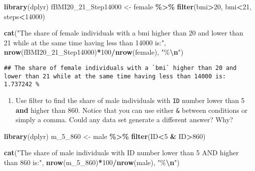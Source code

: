 \documentclass[
]{book}
\newenvironment{Shaded}{\begin{snugshade}}{\end{snugshade}}
\newcommand{\DecValTok}[1]{\textcolor[rgb]{0.00,0.00,0.81}{#1}}
\newcommand{\FunctionTok}[1]{\textcolor[rgb]{0.13,0.29,0.53}{\textbf{#1}}}
\newcommand{\NormalTok}[1]{#1}
\newcommand{\OtherTok}[1]{\textcolor[rgb]{0.56,0.35,0.01}{#1}}
\newcommand{\SpecialCharTok}[1]{\textcolor[rgb]{0.81,0.36,0.00}{\textbf{#1}}}
\newcommand{\StringTok}[1]{\textcolor[rgb]{0.31,0.60,0.02}{#1}}
\providecommand{\tightlist}{%
  \setlength{\itemsep}{0pt}\setlength{\parskip}{0pt}}
\begin{document}
\begin{Shaded}
\begin{Highlighting}[]
\FunctionTok{library}\NormalTok{(dplyr)}
\NormalTok{fBMI20\_21\_Step14000 }\OtherTok{\textless{}{-}}\NormalTok{ female }\SpecialCharTok{\%\textgreater{}\%}
  \FunctionTok{filter}\NormalTok{(bmi}\SpecialCharTok{\textgreater{}}\DecValTok{20}\NormalTok{, bmi}\SpecialCharTok{\textless{}}\DecValTok{21}\NormalTok{, steps}\SpecialCharTok{\textless{}}\DecValTok{14000}\NormalTok{)}

\FunctionTok{cat}\NormalTok{(}\StringTok{"The share of female individuals with a \textasciigrave{}bmi\textasciigrave{} higher than 20 and lower than 21 while at the same time having less than 14000 is:"}\NormalTok{, }\FunctionTok{nrow}\NormalTok{(fBMI20\_21\_Step14000)}\SpecialCharTok{*}\DecValTok{100}\SpecialCharTok{/}\FunctionTok{nrow}\NormalTok{(female), }\StringTok{"\%}\SpecialCharTok{\textbackslash{}n}\StringTok{"}\NormalTok{)}
\end{Highlighting}
\end{Shaded}

\begin{verbatim}
## The share of female individuals with a `bmi` higher than 20 and lower than 21 while at the same time having less than 14000 is: 1.737242 %
\end{verbatim}

\begin{enumerate}
\def\labelenumi{\arabic{enumi}.}
\setcounter{enumi}{7}
\tightlist
\item
  Use filter to find the share of male individuals with \texttt{ID} number lower than 5 \textbf{and} higher than 860. Notice that you can use either \texttt{\&} between conditions or simply a comma. Could any data set generate a different answer? Why?
\end{enumerate}

\begin{Shaded}
\begin{Highlighting}[]
\FunctionTok{library}\NormalTok{(dplyr)}
\NormalTok{m\_5\_860 }\OtherTok{\textless{}{-}}\NormalTok{ male }\SpecialCharTok{\%\textgreater{}\%}
  \FunctionTok{filter}\NormalTok{(ID}\SpecialCharTok{\textless{}}\DecValTok{5} \SpecialCharTok{\&}\NormalTok{ ID}\SpecialCharTok{\textgreater{}}\DecValTok{860}\NormalTok{)}

\FunctionTok{cat}\NormalTok{(}\StringTok{"The share of male individuals with \textasciigrave{}ID\textasciigrave{} number lower than 5 AND higher than 860 is:"}\NormalTok{, }\FunctionTok{nrow}\NormalTok{(m\_5\_860)}\SpecialCharTok{*}\DecValTok{100}\SpecialCharTok{/}\FunctionTok{nrow}\NormalTok{(male), }\StringTok{"\%}\SpecialCharTok{\textbackslash{}n}\StringTok{"}\NormalTok{)}
\end{Highlighting}
\end{Shaded}
\end{document}
